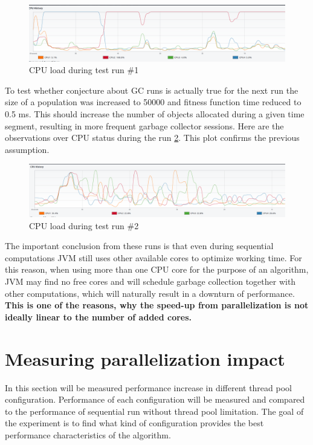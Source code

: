 \begin{figure}[h]
\centering\includegraphics[width=1\textwidth]{img/exp/1/cpu-500}
\caption{CPU load during test run \#1}  \label{img:cpu-run-1}
\end{figure}

To test whether conjecture about GC runs is actually true for the next run the size of a population was increased to 50000 and fitness function time reduced to 0.5 ms. This should increase the number of objects allocated during a given time segment, resulting in more frequent garbage collector sessions. Here are the observations over CPU status during the run \ref{img:cpu-run-2}. This plot confirms the previous assumption.

\begin{figure}[h]
\centering\includegraphics[width=1\textwidth]{img/exp/1/cpu-5000}
\caption{CPU load during test run \#2}  \label{img:cpu-run-2}
\end{figure}

The important conclusion from these runs is that even during sequential computations JVM still uses other available cores to optimize working time. For this reason, when using more than one CPU core for the purpose of an algorithm, JVM may find no free cores and will schedule garbage collection together with other computations, which will naturally result in a downturn of performance. \textbf{This is one of the reasons, why the speed-up from parallelization is not ideally linear to the number of added cores.}


\section{Measuring parallelization impact}

In this section will be measured performance increase in different thread pool configuration.
Performance of each configuration will be measured and compared to the performance of sequential run without thread pool limitation. The goal of the experiment is to find what kind of configuration provides the best performance characteristics of the algorithm.


